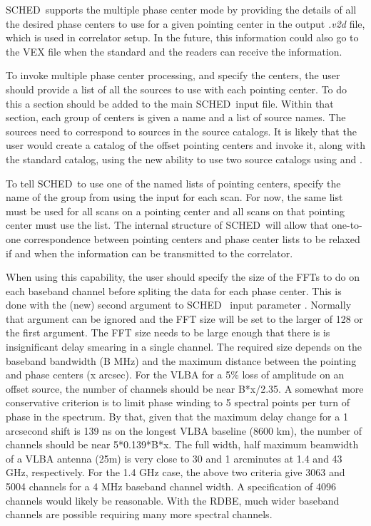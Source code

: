\documentclass{report}
\newcommand{\schedb}{{\sc SCHED~}}
\begin{document}
\schedb supports the multiple phase center mode by providing the
details of all the desired phase centers to use for a given pointing
center in the output {\sl .v2d} file, which is used in correlator
setup.  In the future, this information could also go to the VEX file
when the standard and the readers can receive the information.

To invoke multiple phase center processing, and specify the centers,
the user should provide a list of all the sources to use with each
pointing center.  To do this a 
section should be added to the main \schedb input file.  Within that
section, each group of centers is given a name and a list of source
names.  The sources need to correspond to sources in the source
catalogs.  It is likely that the user would create a catalog of the
offset pointing centers and invoke it, along with the standard
catalog, using the new ability to use two source catalogs using
 and .

To tell \schedb to use one of the named lists of pointing centers,
specify the name of the group from  using the input  for each scan.  For now, the same list must be
used for all scans on a pointing center and all scans on that pointing
center must use the list.  The internal structure of \schedb will
allow that one-to-one correspondence between pointing centers and
phase center lists to be relaxed if and when the information can
be transmitted to the correlator.

When using this capability, the user should specify the size of the
FFTs to do on each baseband channel before spliting the data for each
phase center.  This is done with the (new) second argument to \schedb
input parameter .  Normally that
argument can be ignored and the FFT size will be set to the larger of
128 or the first argument.  The FFT size needs to be large enough that
there is is insignificant delay smearing in a single channel.  The
required size depends on the baseband bandwidth (B MHz) and the
maximum distance between the pointing and phase centers (x arcsec).
For the VLBA for a 5\% loss of amplitude on an offset source, the
number of channels should be near B*x/2.35.  A somewhat more
conservative criterion is to limit phase winding to 5 spectral points
per turn of phase in the spectrum.  By that, given that the maximum
delay change for a 1 arcsecond shift is 139 ns on the longest VLBA
baseline (8600 km), the number of channels should be near 5*0.139*B*x.
The full width, half maximum beamwidth of a VLBA antenna (25m) is very
close to 30 and 1 arcminutes at 1.4 and 43 GHz, respectively.  For the
1.4 GHz case, the above two criteria give 3063 and 5004 channels for a
4 MHz baseband channel width.  A specification of 4096 channels would
likely be reasonable.  With the RDBE, much wider baseband channels 
are possible requiring many more spectral channels.
\end{document}
